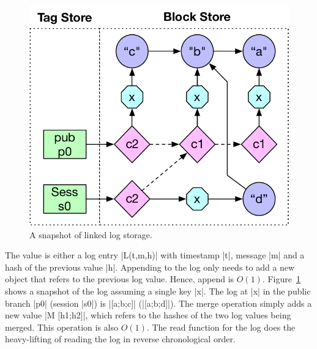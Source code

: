 \begin{figure}
	\vspace{-1cm}
	\centering
	\includegraphics[scale=0.4]{figures/linked_log}
	\caption{A snapshot of linked log storage.}
	\label{fig:linked_log}
	\vspace{-0.5cm}
\end{figure}
The value is either a log entry |L(t,m,h)| with timestamp |t|, message |m| and
a hash of the previous value |h|. Appending to the log only needs to add a new
object that refers to the previous log value. Hence, append is $O(1)$.
Figure~\ref{fig:linked_log} shows a snapshot of the log assuming a single key
|x|. The log at |x| in the public branch |p0| (session |s0|) is |[a;b;c]|
(|[a;b;d]|). The merge operation simply adds a new value |M [h1;h2]|, which
refers to the hashes of the two log values being merged. This operation is also
$O(1)$. The read function for the log does the heavy-lifting of reading the log
in reverse chronological order.

